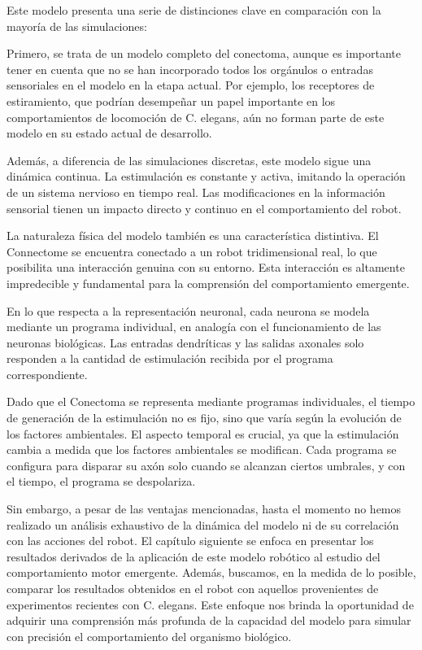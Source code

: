 Este modelo presenta una serie de distinciones clave en comparación con la mayoría de las simulaciones:

Primero, se trata de un modelo completo del conectoma, aunque es importante tener en cuenta que no se han incorporado todos los orgánulos o entradas sensoriales en el modelo en la etapa actual. Por ejemplo, los receptores de estiramiento, que podrían desempeñar un papel importante en los comportamientos de locomoción de C. elegans, aún no forman parte de este modelo en su estado actual de desarrollo.

Además, a diferencia de las simulaciones discretas, este modelo sigue una dinámica continua. La estimulación es constante y activa, imitando la operación de un sistema nervioso en tiempo real. Las modificaciones en la información sensorial tienen un impacto directo y continuo en el comportamiento del robot.

La naturaleza física del modelo también es una característica distintiva. El Connectome se encuentra conectado a un robot tridimensional real, lo que posibilita una interacción genuina con su entorno. Esta interacción es altamente impredecible y fundamental para la comprensión del comportamiento emergente.

En lo que respecta a la representación neuronal, cada neurona se modela mediante un programa individual, en analogía con el funcionamiento de las neuronas biológicas. Las entradas dendríticas y las salidas axonales solo responden a la cantidad de estimulación recibida por el programa correspondiente.

Dado que el Conectoma se representa mediante programas individuales, el tiempo de generación de la estimulación no es fijo, sino que varía según la evolución de los factores ambientales. El aspecto temporal es crucial, ya que la estimulación cambia a medida que los factores ambientales se modifican. Cada programa se configura para disparar su axón solo cuando se alcanzan ciertos umbrales, y con el tiempo, el programa se despolariza.

Sin embargo, a pesar de las ventajas mencionadas, hasta el momento no hemos realizado un análisis exhaustivo de la dinámica del modelo ni de su correlación con las acciones del robot. El capítulo siguiente se enfoca en presentar los resultados derivados de la aplicación de este modelo robótico al estudio del comportamiento motor emergente. Además, buscamos, en la medida de lo posible, comparar los resultados obtenidos en el robot con aquellos provenientes de experimentos recientes con C. elegans. Este enfoque nos brinda la oportunidad de adquirir una comprensión más profunda de la capacidad del modelo para simular con precisión el comportamiento del organismo biológico.











